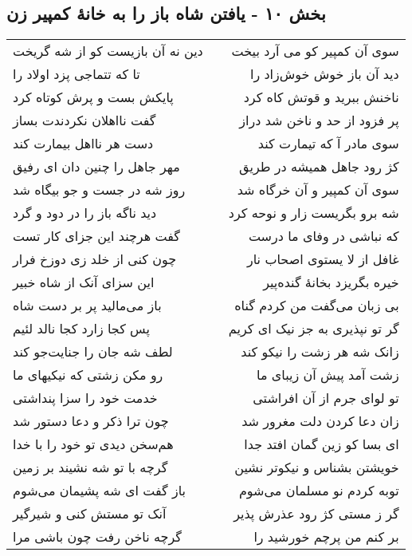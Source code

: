 \begin{center}
\section*{بخش ۱۰ - یافتن شاه باز را به خانهٔ کمپیر زن}
\label{sec:sh010}
\begin{longtable}{l p{0.5cm} r}
دین نه آن بازیست کو از شه گریخت
&&
سوی آن کمپیر کو می آرد بیخت
\\
تا که تتماجی پزد اولاد را
&&
دید آن باز خوش خوش‌زاد را
\\
پایکش بست و پرش کوتاه کرد
&&
ناخنش ببرید و قوتش کاه کرد
\\
گفت نااهلان نکردندت بساز
&&
پر فزود از حد و ناخن شد دراز
\\
دست هر نااهل بیمارت کند
&&
سوی مادر آ که تیمارت کند
\\
مهر جاهل را چنین دان ای رفیق
&&
کژ رود جاهل همیشه در طریق
\\
روز شه در جست و جو بیگاه شد
&&
سوی آن کمپیر و آن خرگاه شد
\\
دید ناگه باز را در دود و گرد
&&
شه برو بگریست زار و نوحه کرد
\\
گفت هرچند این جزای کار تست
&&
که نباشی در وفای ما درست
\\
چون کنی از خلد زی دوزخ فرار
&&
غافل از لا یستوی اصحاب نار
\\
این سزای آنک از شاه خبیر
&&
خیره بگریزد بخانهٔ گنده‌پیر
\\
باز می‌مالید پر بر دست شاه
&&
بی زبان می‌گفت من کردم گناه
\\
پس کجا زارد کجا نالد لئیم
&&
گر تو نپذیری به جز نیک ای کریم
\\
لطف شه جان را جنایت‌جو کند
&&
زانک شه هر زشت را نیکو کند
\\
رو مکن زشتی که نیکیهای ما
&&
زشت آمد پیش آن زیبای ما
\\
خدمت خود را سزا پنداشتی
&&
تو لوای جرم از آن افراشتی
\\
چون ترا ذکر و دعا دستور شد
&&
زان دعا کردن دلت مغرور شد
\\
هم‌سخن دیدی تو خود را با خدا
&&
ای بسا کو زین گمان افتد جدا
\\
گرچه با تو شه نشیند بر زمین
&&
خویشتن بشناس و نیکوتر نشین
\\
باز گفت ای شه پشیمان می‌شوم
&&
توبه کردم نو مسلمان می‌شوم
\\
آنک تو مستش کنی و شیرگیر
&&
گر ز مستی کژ رود عذرش پذیر
\\
گرچه ناخن رفت چون باشی مرا
&&
بر کنم من پرچم خورشید را
\\

\end{longtable}
\end{center}
